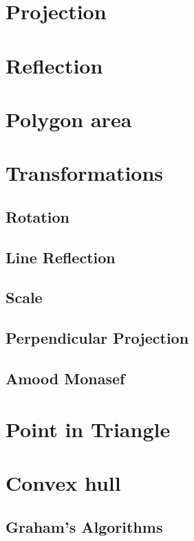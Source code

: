 	\section{Projection}
	\section{Reflection}
	\section{Polygon area}
	\section{Transformations}
		\subsection{Rotation}
		\subsection{Line Reflection}
		\subsection{Scale}
		\subsection{Perpendicular Projection}
		\subsection{Amood Monasef}
	\section{Point in Triangle}
	\section{Convex hull}
		\subsection{Graham's Algorithms}
			
